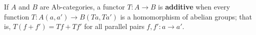 If $A$ and $B$ are Ab-categories, a functor $T: A \rightarrow B$ is \textbf{additive} when every function $T: A(a, a') \rightarrow B(Ta, Ta')$ is a homomorphism of abelian groups; that is, $T(f + f') = Tf + Tf'$ for all parallel pairs $f, f': a \rightarrow a'$.